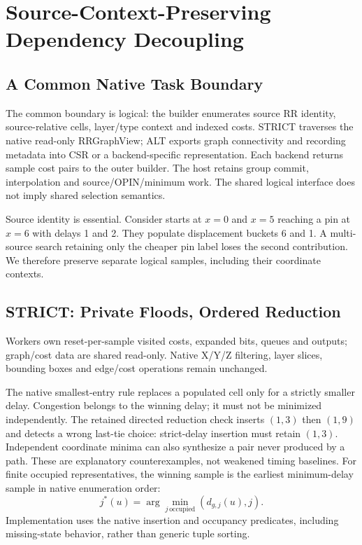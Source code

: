 \section{Source-Context-Preserving Dependency Decoupling}
\subsection{A Common Native Task Boundary}
The common boundary is logical: the builder enumerates source RR identity, source-relative cells, layer/type context and indexed costs. STRICT traverses the native read-only RRGraphView; ALT exports graph connectivity and recording metadata into CSR or a backend-specific representation. Each backend returns sample cost pairs to the outer builder. The host retains group commit, interpolation and source/OPIN/minimum work. The shared logical interface does not imply shared selection semantics.

Source identity is essential. Consider starts at $x=0$ and $x=5$ reaching a pin at $x=6$ with delays 1 and 2. They populate displacement buckets 6 and 1. A multi-source search retaining only the cheaper pin label loses the second contribution. We therefore preserve separate logical samples, including their coordinate contexts.



\subsection{STRICT: Private Floods, Ordered Reduction}
Workers own reset-per-sample visited costs, expanded bits, queues and outputs; graph/cost data are shared read-only. Native X/Y/Z filtering, layer slices, bounding boxes and edge/cost operations remain unchanged.

The native smallest-entry rule replaces a populated cell only for a strictly smaller delay. Congestion belongs to the winning delay; it must not be minimized independently. The retained directed reduction check inserts $(1,3)$ then $(1,9)$ and detects a wrong last-tie choice: strict-delay insertion must retain $(1,3)$. Independent coordinate minima can also synthesize a pair never produced by a path. These are explanatory counterexamples, not weakened timing baselines. For finite occupied representatives, the winning sample is the earliest minimum-delay sample in native enumeration order:
\begin{equation}
j^*(u)=\arg\min_{j\,\mathrm{occupied}}(d_{g,j}(u),j).
\end{equation}
Implementation uses the native insertion and occupancy predicates, including missing-state behavior, rather than generic tuple sorting.

